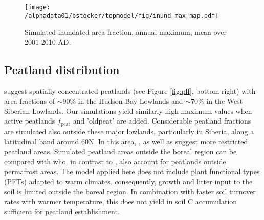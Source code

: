 \begin{figure}[ht!]
\begin{center}
  \texttt{[image: /alphadata01/bstocker/topmodel/fig/inund\_max\_map.pdf]}
\end{center}
\caption{Simulated inundated area fraction, annual maximum, mean over 2001-2010 AD.}
\label{fig:inundmax}
\end{figure}

\clearpage

\subsection{Peatland distribution}
\citet{tarnocai09gbc} suggest spatially concentrated peatlands (see Figure \ref{fig:plf}, bottom right) with area fractions of $\sim$90\% in the Hudson Bay Lowlands and $\sim$70\% in the West Siberian Lowlands. Our simulations yield similarly high maximum values when active peatlands $f_{\text{peat}}$ and 'oldpeat' are added. Considerable peatland fractions are simulated also outside these major lowlands, particularly in Siberia, along a latitudinal band around 60\degrees N. In this area, \citet{tarnocai09gbc}, as well as \citet{yu10grl} suggest more restricted peatland areas. Simulated peatland areas outside the boreal region can be compared with \citet{yu10grl} who, in contrast to \citet{tarnocai09gbc}, also account for peatlands outside permafrost areas. The model applied here does not include plant functional types (PFTs) adapted to warm climates. consequently, growth and litter input to the soil is limited outside the boreal region. In combination with faster soil turnover rates with warmer temperature, this does not yield in soil C accumulation sufficient for peatland establishment.\\


